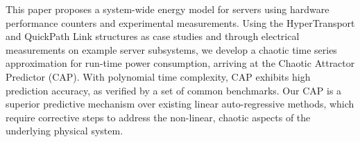 This paper proposes a system-wide energy model for servers
using hardware performance counters and experimental measurements.
Using the HyperTransport and QuickPath Link structures as case studies
and through electrical measurements on example server subsystems, we
develop a chaotic time series approximation for run-time power
consumption, arriving at the Chaotic Attractor Predictor (CAP).  With
polynomial time complexity, CAP exhibits high prediction accuracy, as
verified by a set of common benchmarks.  Our CAP is a superior
predictive mechanism over existing linear auto-regressive methods, which
require corrective steps to address the non-linear, chaotic aspects of
the underlying physical system.

